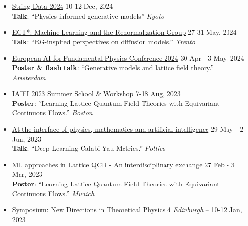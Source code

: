 \documentclass[11pt, letterpaper]{article}
\newcommand{\dateright}[1]{\hfill{\small\color{accentblue} #1}}
\begin{document}
\begin{itemize}[resume, itemsep=5pt]
    \item {\href{https://mlphys.scphys.kyoto-u.ac.jp/stringdata2024/}{String Data 2024}} \dateright{10-12 Dec, 2024} \\
    {\footnotesize \textbf{Talk}: “Physics informed generative models”} \dateright{{\color{black} \textit{Kyoto}}}

    \item {\href{https://indico.ectstar.eu/event/206/contributions/4799/}{ECT*: Machine Learning and the Renormalization Group}} \dateright{ 27-31 May, 2024} \\
    {\footnotesize \textbf{Talk}: “RG-inspired perspectives on diffusion models.”} \dateright{{\color{black}\textit{Trento}}}

    \item {\href{https://indico.nikhef.nl/event/4875/contributions/20373/}{European AI for Fundamental Physics Conference 2024}} \dateright{ 30 Apr - 3 May, 2024} \\
    {\footnotesize \textbf{Poster \& flash talk}: “Generative models and lattice field theory.”} \dateright{{\color{black}\textit{Amsterdam}}}

    \item {\href{https://iaifi.org/past-workshops.html}{IAIFI 2023 Summer School \& Workshop}} \dateright{ 7-18 Aug, 2023} \\
    {\footnotesize \textbf{Poster}: “Learning Lattice Quantum Field Theories with Equivariant Continuous Flows.”} \dateright{{\color{black}\textit{Boston}}}

    \item {\href{https://agenda.infn.it/event/33851/}{At the interface of physics, mathematics and artificial intelligence}} \dateright{ 29 May - 2 Jun, 2023} \\
    {\footnotesize \textbf{Talk}: “Deep Learning Calabi-Yau Metrics.”} \dateright{{\color{black}\textit{Pollica}}}

    \item {\href{https://indico.ph.tum.de/event/7116/}{ML approaches in Lattice QCD - An interdisciplinary exchange}} \dateright{ 27 Feb - 3 Mar, 2023} \\
    {\footnotesize \textbf{Poster}: “Learning Lattice Quantum Field Theories with Equivariant Continuous Flows.”} \dateright{{\color{black}\textit{Munich}}}

    \item {\href{https://indico.ph.ed.ac.uk/event/124/}{Symposium: New Directions in Theoretical Physics 4}} \dateright{{\color{black}\textit{Edinburgh} -- } 10-12 Jan, 2023}


\end{itemize}
\end{document}
